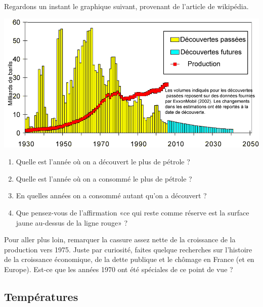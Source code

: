 Regardons un instant le graphique suivant, provenant de l'article  de wikipédia.

\includegraphics[width=17cm]{Decouvertes-petrole.png}

\begin{enumerate}
    \item
        Quelle est l'année où on a découvert le plus de pétrole ?
    \item
        Quelle est l'année où on a consommé le plus de pétrole ?
    \item
        En quelles années on a consommé autant qu'on a découvert ?
    \item
        Que pensez-vous de l'affirmation «ce qui reste comme réserve est la surface jaune au-dessus de la ligne rouge» ?
\end{enumerate}
Pour aller plus loin, remarquer la cassure assez nette de la croissance de la production vers 1975. Juste par curiosité, faites quelque recherches sur l'histoire de la croissance économique, de la dette publique et le chômage en France (et en Europe). Est-ce que les années 1970 ont été spéciales de ce point de vue ?

\subsection{Températures}

